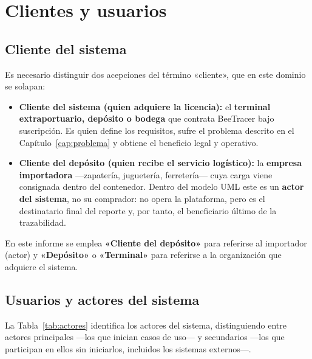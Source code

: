\chapter{Clientes y usuarios}
\label{cap:clientes}

\section{Cliente del sistema}
\label{sec:clientesistema}

Es necesario distinguir dos acepciones del término «cliente», que en este dominio se solapan:

\begin{itemize}
    \item \textbf{Cliente del sistema (quien adquiere la licencia):} el \textbf{terminal
          extraportuario, depósito o bodega} que contrata BeeTracer bajo suscripción. Es quien
          define los requisitos, sufre el problema descrito en el Capítulo~\ref{cap:problema} y
          obtiene el beneficio legal y operativo.
    \item \textbf{Cliente del depósito (quien recibe el servicio logístico):} la \textbf{empresa
          importadora} ---zapatería, juguetería, ferretería--- cuya carga viene consignada dentro
          del contenedor. Dentro del modelo UML este es un \textbf{actor del sistema}, no su
          comprador: no opera la plataforma, pero es el destinatario final del reporte y, por
          tanto, el beneficiario último de la trazabilidad.
\end{itemize}

En este informe se emplea \textbf{«Cliente del depósito»} para referirse al importador (actor) y
\textbf{«Depósito»} o \textbf{«Terminal»} para referirse a la organización que adquiere el sistema.

\section{Usuarios y actores del sistema}
\label{sec:actores}

La Tabla~\ref{tab:actores} identifica los actores del sistema, distinguiendo entre actores
principales ---los que inician casos de uso--- y secundarios ---los que participan en ellos sin
iniciarlos, incluidos los sistemas externos---.

